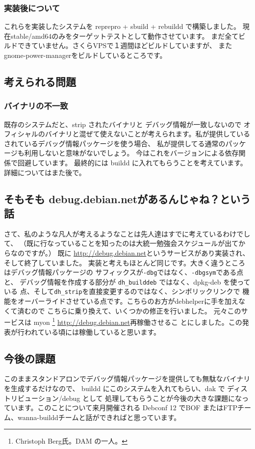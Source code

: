 \documentclass[mingoth,a4paper]{jsarticle}
\begin{document}
\subsubsection{実装後について}

これらを実装したシステムを reprepro + sbuild + rebuildd で構築しました。
現在stable/amd64のみをターゲットテストとして動作させています。
まだ全てビルドできていません。さくらVPSで１週間ほどビルドしていますが、
またgnome-power-managerをビルドしているところです。

\subsection{考えられる問題}

\subsubsection{バイナリの不一致}
既存のシステムだと、strip されたバイナリと デバッグ情報が一致しないので
オフィシャルのバイナリと混ぜて使えないことが考えられます。私が提供している
されているデバッグ情報パッケージを使う場合、
私が提供してる通常のパッケージも利用しないと意味がないでしょう。
今はこれをバージョンによる依存関係で回避しています。
最終的には buildd に入れてもらうことを考えています。詳細についてはまた後で。

\subsection{そもそも debug.debian.netがあるんじゃね？という話}
さて、私のような凡人が考えるようなことは先人達はすでに考えているわけでして、
（既に行なっていることを知ったのは大統一勉強会スケジュールが出てからなのですが。）
既に \url{http://debug.debian.net}というサービスがあり実装され、そして終了していました。
実装と考えもほとんど同じです。大きく違うところはデバッグ情報パッケージの
サフィックスが\texttt{-dbg}ではなく、\texttt{-dbgsym}である点と、
デバッグ情報を作成する部分が \texttt{dh\_builddeb} ではなく、dpkg-deb を使っている
点、そして\texttt{dh\_strip}を直接変更するのではなく、シンボリックリンクで
機能をオーバーライドさせている点です。こちらのお方がdebhelperに手を加えなくて済むので
こちらに乗り換えて、いくつかの修正を行いました。
元々このサービスは myon \footnote{Christoph Berg氏。DAM の一人。}
\url{http://debug.debian.net}再稼働させるこ
とにしました。この発表が行われている頃には稼働していると思います。

\subsection{今後の課題}

このままスタンドアロンでデバッグ情報パッケージを提供しても無駄なバイナリを生成するだけなので、
buildd にこのシステムを入れてもらい、dak で ディストリビューション/debug として
処理してもらうことが今後の大きな課題になっています。このことについて来月開催される Debconf 12 
でBOF またはFTPチーム、wanna-builddチームと話ができればと思っています。
\end{document}
